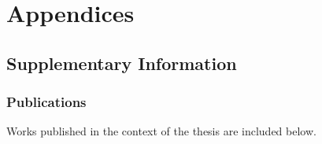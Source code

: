 \ctpartquote{}
\ctparttext{}
\part{Appendices}

\chapter{Supplementary Information}
\label{sec:supdata}

 \section{Publications}
 \label{sec:appendix:publications}

    Works published in the context of the thesis are included below.

    
